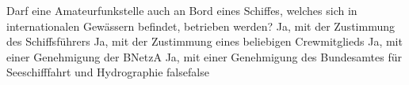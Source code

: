     {Darf eine Amateurfunkstelle auch an Bord eines Schiffes, welches sich in internationalen Gewässern befindet, betrieben werden?}
    {Ja, mit der Zustimmung des Schiffsführers}
    {Ja, mit der Zustimmung eines beliebigen Crewmitglieds}
    {Ja, mit einer Genehmigung der BNetzA}
    {Ja, mit einer Genehmigung des Bundesamtes für Seeschifffahrt und Hydrographie}
    {false}{false}